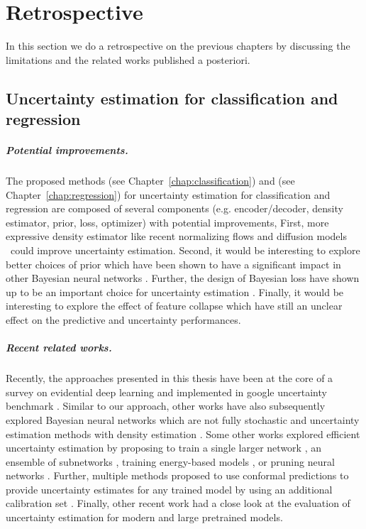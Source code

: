 \chapter{Retrospective}
\label{chap:retrospective}

In this section we do a retrospective on the previous chapters by discussing the limitations and the related works published a posteriori.

\section{Uncertainty estimation for classification and regression} 

\paragraph{Potential improvements.} The proposed methods \PostNetacro{} (see Chapter~\ref{chap:classification}) and \NatPNacro{} (see Chapter~\ref{chap:regression}) for uncertainty estimation for classification and regression are composed of several components (e.g. encoder/decoder, density estimator, prior, loss, optimizer) with potential improvements, First, more expressive density estimator like recent normalizing flows \cite{nf-review} and diffusion models \cite{variationaldiffussion2022kingma} could improve uncertainty estimation. Second, it would be interesting to explore better choices of prior which have been shown to have a significant impact in other Bayesian neural networks \cite{bayesposterior2020wenzel, coldaleatoric2020adlam}. Further, the design of Bayesian loss have shown up to be an important choice for uncertainty estimation \cite{bengs2022pitfalls}. Finally, it would be interesting to explore the effect of feature collapse \cite{due} which have still an unclear effect on the predictive and uncertainty performances.

\paragraph{Recent related works.} Recently, the approaches presented in this thesis have been  at the core of a survey on evidential deep learning \cite{survey_evidential_uncertainty} and implemented in google uncertainty benchmark \cite{nado2021uncertainty}. Similar to our approach, other works have also subsequently explored Bayesian neural networks which are not fully stochastic \cite{bnnfullystochastic2022sharma} and uncertainty estimation methods with density estimation \cite{du2022vos, postels2020hiddenuncertainty, uncertainty-generative-classifier}. Some other works explored efficient uncertainty estimation by proposing to train a single larger network \cite{abe2022deep}, an ensemble of subnetworks \cite{mimo-independent-subnetworks}, training energy-based models \cite{ood_ebm}, or pruning neural networks \cite{ayle2022robustness-sparse}. Further, multiple methods proposed to use conformal predictions to provide uncertainty estimates for any trained model by using an additional calibration set \cite{conformal-survey, Park2020PAC}. Finally, other recent work \cite{minderer2021revisiting, tran2022plex} had a close look at the evaluation of uncertainty estimation for modern and large pretrained models.

